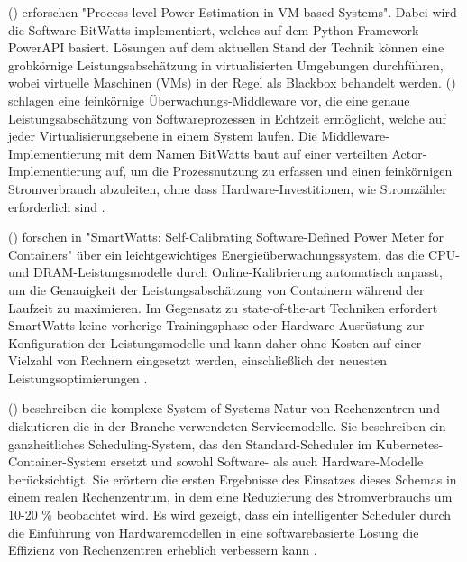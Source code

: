 \citeauthor{colmant:hal-01130030} (\citeyear{colmant:hal-01130030})
erforschen "Process-level Power Estimation in VM-based Systems".
Dabei wird die Software BitWatts implementiert,
welches auf dem Python-Framework PowerAPI basiert.
Lösungen auf dem aktuellen Stand der Technik können eine grobkörnige Leistungsabschätzung 
in virtualisierten Umgebungen durchführen, 
wobei virtuelle Maschinen (VMs) in der Regel als Blackbox behandelt werden.
\citeauthor{colmant:hal-01130030} (\citeyear{colmant:hal-01130030})
schlagen eine feinkörnige Überwachungs-Middleware vor, 
die eine genaue Leistungsabschätzung von Softwareprozessen in Echtzeit ermöglicht, 
welche auf jeder Virtualisierungsebene in einem System laufen.
Die Middleware-Implementierung mit dem Namen BitWatts 
baut auf einer verteilten Actor-Implementierung auf, 
um die Prozessnutzung zu erfassen und einen feinkörnigen Stromverbrauch abzuleiten, 
ohne dass Hardware-Investitionen, wie Stromzähler erforderlich sind
\autocite{colmant:hal-01130030}.
\bigskip

\citeauthor{fieni:hal-02470128} (\citeyear{fieni:hal-02470128})
forschen in
"SmartWatts: Self-Calibrating Software-Defined Power Meter for Containers"
über ein leichtgewichtiges Energieüberwachungssystem, das die CPU- und DRAM-Leistungsmodelle 
durch Online-Kalibrierung automatisch anpasst, um die Genauigkeit der Leistungsabschätzung von Containern 
während der Laufzeit zu maximieren. Im Gegensatz zu state-of-the-art Techniken erfordert SmartWatts keine vorherige
Trainingsphase oder Hardware-Ausrüstung zur Konfiguration der Leistungsmodelle und kann daher ohne Kosten 
auf einer Vielzahl von Rechnern eingesetzt werden, einschließlich der neuesten Leistungsoptimierungen
\autocite{fieni:hal-02470128}.
\bigskip

\citeauthor{8705815} (\citeyear{8705815})
beschreiben die komplexe System-of-Systems-Natur von Rechenzentren und diskutieren 
die in der Branche verwendeten Servicemodelle. Sie beschreiben ein ganzheitliches Scheduling-System, 
das den Standard-Scheduler im Kubernetes-Container-System ersetzt 
und sowohl Software- als auch Hardware-Modelle berücksichtigt. 
Sie erörtern die ersten Ergebnisse des Einsatzes dieses Schemas in einem realen Rechenzentrum, 
in dem eine Reduzierung des Stromverbrauchs um 10-20 \% beobachtet wird. 
Es wird gezeigt, dass ein intelligenter Scheduler durch die Einführung von Hardwaremodellen 
in eine softwarebasierte Lösung die Effizienz von Rechenzentren erheblich verbessern kann
\autocite{8705815}.







